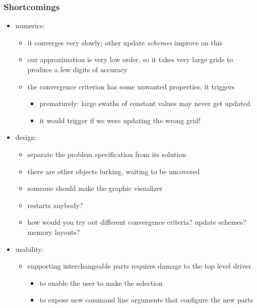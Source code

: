 \begin{frame}[fragile]
%
  \frametitle{Shortcomings}
%
  \begin{itemize}
%
  \item numerics:
    \begin{itemize}
    \item it converges very slowly; other update {\em schemes} improve on this
    \item our approximation is very low order, so it takes very large grids to produce a few
      digits of accuracy
    \item the convergence criterion has some unwanted properties; it triggers
      \begin{itemize}
      \item prematurely: large swaths of constant values may never get updated
      \item it would trigger if we were updating the wrong grid!
      \end{itemize}
    \end{itemize}
%
  \item design:
    \begin{itemize}
    \item separate the problem specification from its solution
    \item there are other objects lurking, waiting to be uncovered
    \item someone should make the graphic visualizer
    \item restarts anybody?
    \item how would you try out different convergence criteria? update schemes? memory layouts?
    \end{itemize}
%
    \item usability:
      \begin{itemize}
      \item supporting interchangeable parts requires damage to the top level driver
        \begin{itemize}
        \item to enable the user to make the selection
        \item to expose new command line arguments that configure the new parts
        \end{itemize}
      \end{itemize}
%
  \end{itemize}
%
\end{frame}


